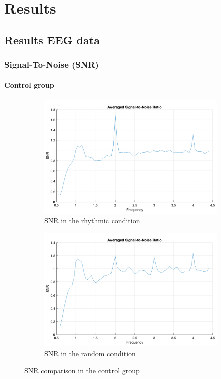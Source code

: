 \clearpage
\chapter*{Results}
\section*{Results EEG data}
\subsection*{Signal-To-Noise (SNR)}
\subsubsection*{Control group}
\begin{figure}[H]
    \centering
    \begin{subfigure}[b]{0.48\textwidth}
        \centering
        \includegraphics[width=\textwidth]{healthy_images/rhythmic_condition_snr.png}
        \caption{SNR in the rhythmic condition}
        \label{fig: snr_rhythmic: control}
    \end{subfigure}
    \hfill
    \begin{subfigure}[b]{0.48\textwidth}
        \centering
        \includegraphics[width=\textwidth]{healthy_images/random_condition_snr.png}
        \caption{SNR in the random condition}
        \label{fig: snr_random: control}
    \end{subfigure}
    \caption{SNR comparison in the control group}
    \label{fig: snr_control_group}
\end{figure}

